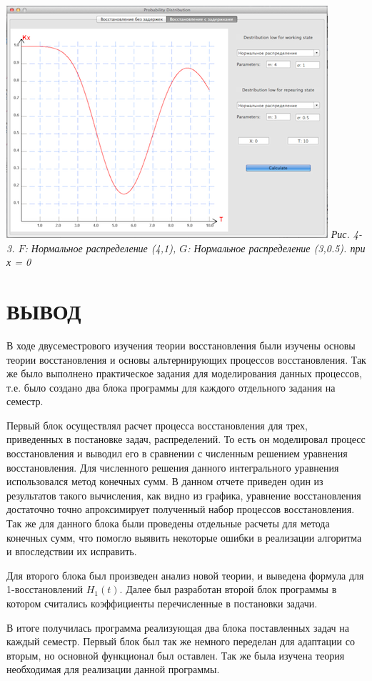 \includegraphics{4-3.png} 
\textit{Рис. 4-3. $F$:  Нормальное распределение (4,1), $G$:  Нормальное распределение (3,0.5). при х  = 0}

\chapter*{ВЫВОД}
В ходе двусеместрового изучения теории  восстановления были изучены основы теории восстановления и основы альтернирующих процессов восстановления. Так же было выполнено практическое задания для моделирования данных  процессов, т.е. было создано два блока программы для каждого отдельного задания на семестр.

Первый блок осуществлял расчет процесса восстановления для трех, приведенных в постановке задач, распределений. То есть он моделировал процесс восстановления и выводил его в сравнении с численным решением уравнения восстановления. Для численного решения данного интегрального уравнения использовался метод конечных сумм. В данном отчете приведен один из результатов такого вычисления, как видно из графика, уравнение восстановления достаточно точно апроксимирует полученный набор процессов восстановления. Так же для данного блока были проведены отдельные расчеты для метода конечных сумм, что помогло выявить некоторые ошибки в реализации алгоритма и впоследствии их исправить.

Для второго блока был произведен анализ новой теории, и выведена формула для 1-восстановлений $H_1(t)$. Далее был разработан второй блок программы в котором считались коэффициенты перечисленные в постановки задачи.

В итоге получилась программа реализующая два блока поставленных задач на каждый семестр. Первый блок был так же немного переделан для адаптации со вторым, но основной функционал был оставлен. Так же была изучена теория необходимая для реализации данной программы.

